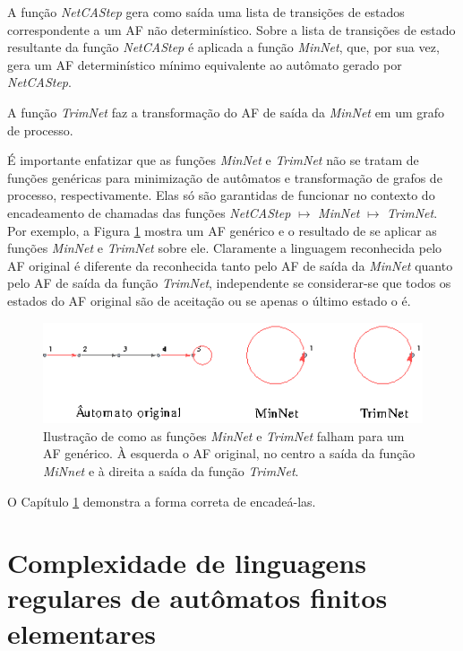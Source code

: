 \documentclass[12pt,a4paper]{article}
\begin{document}
A função \emph{NetCAStep} gera como saída uma lista de transições
de estados correspondente a um AF não determinístico.
Sobre a lista de transições de estado resultante da função
\emph{NetCAStep} é aplicada a função \emph{MinNet}, que, por sua vez,
gera um AF determinístico mínimo equivalente ao autômato gerado por
\emph{NetCAStep}.

A função \emph{TrimNet} faz a transformação do AF de saída da \emph{MinNet}
em um grafo de processo.

É importante enfatizar que as funções \emph{MinNet} e \emph{TrimNet} não se tratam
de funções genéricas para minimização de autômatos e transformação de grafos
de processo, respectivamente. Elas só são garantidas de funcionar no contexto
do encadeamento de chamadas das funções
\emph{NetCAStep} $\mapsto$ \emph{MinNet} $\mapsto$ \emph{TrimNet}.
Por exemplo, a Figura \ref{fig:mintrimfail} mostra um AF genérico e
o resultado de se aplicar as funções \emph{MinNet} e \emph{TrimNet} sobre ele.
Claramente a linguagem reconhecida pelo AF original é diferente da reconhecida
tanto pelo AF de saída da \emph{MinNet} quanto pelo AF de saída da função
\emph{TrimNet}, independente se considerar-se que todos os estados do AF original
são de aceitação ou se apenas o último estado o é.

\begin{figure}[htp]
\begin{center}
\includegraphics[scale=1.0]{img/MinNetTrimNetFail.eps}
\caption{Ilustração de como as funções \emph{MinNet} e \emph{TrimNet}
falham para um AF genérico. À esquerda o AF original, no centro a saída
da função \emph{MiNnet} e à direita a saída da função \emph{TrimNet}.}
\label{fig:mintrimfail}
\end{center}
\end{figure}

O Capítulo \ref{sec:complexity} demonstra a forma correta de encadeá-las.

\newpage

\section{Complexidade de linguagens regulares de autômatos
finitos elementares}\label{sec:complexity}
\end{document}
